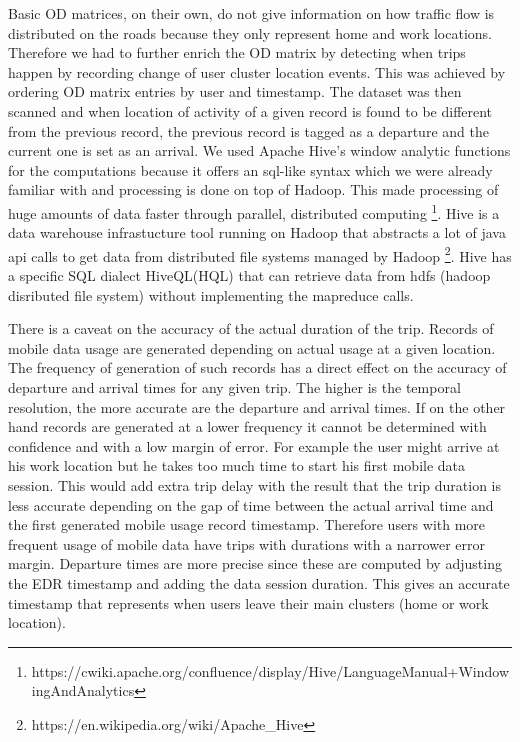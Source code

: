 \documentclass[12pt, a4paper]{report}
\theoremstyle{definition}
\theoremstyle{definition}%
\theoremstyle{definition}%
\theoremstyle{definition}%
\theoremstyle{definition}%
\theoremstyle{definition}%
\begin{document}
Basic OD matrices, on their own, do not give information on how traffic flow is distributed on the roads because they only represent home and work locations. Therefore we had to further enrich the OD matrix by detecting when trips happen by recording change of user cluster location events. This was achieved by ordering OD matrix entries by user and timestamp. The dataset was then scanned and when location of activity of a given record is found to be different from the previous record, the previous record is tagged as a departure and the current one is set as an arrival. We used Apache Hive's window analytic functions for the computations because it offers an sql-like syntax which we were already familiar with and processing is done on top of Hadoop. This made processing of huge amounts of data faster through parallel, distributed computing  \footnote{https://cwiki.apache.org/confluence/display/Hive/LanguageManual+WindowingAndAnalytics}. Hive is a data warehouse infrastucture tool running on Hadoop that abstracts a lot of java api calls to get data from distributed file systems managed by Hadoop \footnote{https://en.wikipedia.org/wiki/Apache\_Hive}. Hive has a specific SQL dialect HiveQL(HQL) that can retrieve data from hdfs (hadoop disributed file system) without implementing the mapreduce calls.


There is a caveat on the accuracy of the actual duration of the trip. Records of mobile data usage are generated depending on actual usage at a given location. The frequency of generation of such records has a direct effect on the accuracy of departure and arrival times for any given trip. The higher is the temporal resolution, the more accurate are the departure and arrival times. If on the other hand records are generated at a lower frequency it cannot be determined with confidence and with a low margin of error. For example the user might arrive at his work location but he takes too much time to start his first mobile data session. This would add extra trip delay with the result that the trip duration is less accurate depending on the gap of time between the actual arrival time and the first generated mobile usage record timestamp. Therefore users with more frequent usage of mobile data have trips with durations with a narrower error margin. Departure times are more precise since these are computed by adjusting the EDR timestamp and adding the data session duration. This gives an accurate timestamp that represents when users leave their main clusters (home or work location).   
\end{document}
